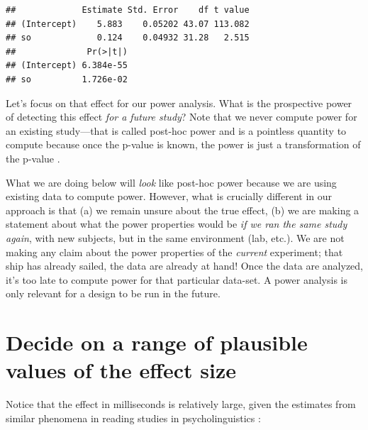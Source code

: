 \documentclass[12pt,]{krantz}
\newenvironment{Shaded}{\begin{snugshade}}{\end{snugshade}}
\newcommand{\CommentTok}[1]{\textcolor[rgb]{0.56,0.35,0.01}{\textit{#1}}}
\newcommand{\DecValTok}[1]{\textcolor[rgb]{0.00,0.00,0.81}{#1}}
\newcommand{\KeywordTok}[1]{\textcolor[rgb]{0.13,0.29,0.53}{\textbf{#1}}}
\newcommand{\NormalTok}[1]{#1}
\newcommand{\OperatorTok}[1]{\textcolor[rgb]{0.81,0.36,0.00}{\textbf{#1}}}
\begin{document}
\begin{verbatim}
##             Estimate Std. Error    df t value
## (Intercept)    5.883    0.05202 43.07 113.082
## so             0.124    0.04932 31.28   2.515
##              Pr(>|t|)
## (Intercept) 6.384e-55
## so          1.726e-02
\end{verbatim}

Let's focus on that effect for our power analysis. What is the prospective power of detecting this effect \emph{for a future study}? Note that we never compute power for an existing study---that is called post-hoc power and is a pointless quantity to compute because once the p-value is known, the power is just a transformation of the p-value \citep{hoenigheisey}.

What we are doing below will \emph{look} like post-hoc power because we are using existing data to compute power. However, what is crucially different in our approach is that (a) we remain unsure about the true effect, (b) we are making a statement about what the power properties would be \emph{if we ran the same study again}, with new subjects, but in the same environment (lab, etc.). We are not making any claim about the power properties of the \emph{current} experiment; that ship has already sailed, the data are already at hand! Once the data are analyzed, it's too late to compute power for that particular data-set. A power analysis is only relevant for a design to be run in the future.

\hypertarget{decide-on-a-range-of-plausible-values-of-the-effect-size}{%
\section{Decide on a range of plausible values of the effect size}\label{decide-on-a-range-of-plausible-values-of-the-effect-size}}

Notice that the effect in milliseconds is relatively large, given the estimates from similar phenomena in reading studies in psycholinguistics \citep{JaegerEngelmannVasishth2017}:

\begin{Shaded}
\end{Shaded}
\end{document}
